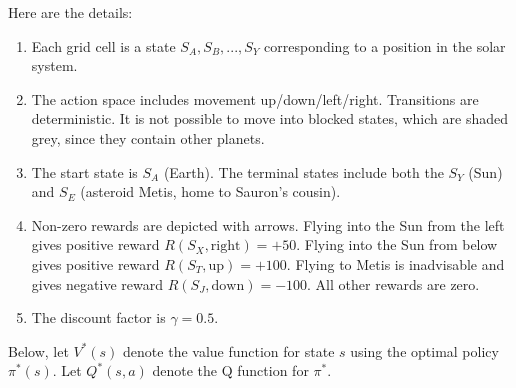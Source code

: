 \documentclass[11pt,addpoints,answers]{exam}
\begin{document}
\begin{questions}
\begin{center}
\end{center}

Here are the details:

\begin{enumerate}
    \item Each grid cell is a state $S_A, S_B,..., S_Y$ corresponding to a position in the solar system.
    \item The action space includes movement up/down/left/right.
Transitions are deterministic. It is not possible to move into blocked states, which are shaded grey, since they contain other planets.
    \item The start state is $S_A$ (Earth). The terminal states include both the $S_Y$ (Sun) and $S_E$ (asteroid Metis, home to Sauron's cousin).
    \item Non-zero rewards are depicted with arrows.  Flying into the Sun from the left gives positive reward $R(S_X, \text{right}) = +50$. Flying into the Sun from below gives positive reward $R(S_T, \text{up}) = +100$. Flying to Metis is inadvisable and gives negative reward $R(S_J, \text{down}) = -100$. All other rewards are zero.
    \item The discount factor is $\gamma = 0.5$.
\end{enumerate}

    
Below, let $V^*(s)$ denote the value function for state $s$ using the optimal policy $\pi^*(s)$. Let $Q^*(s,a)$ denote the Q function for $\pi^*$.


\end{questions}
\end{document}
